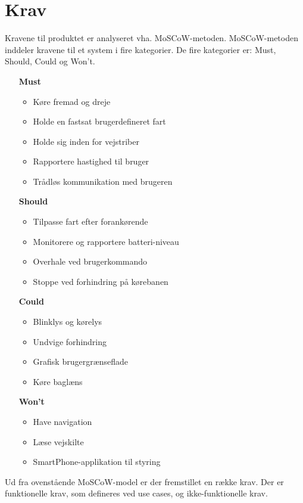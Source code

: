 \chapter{Krav}
Kravene til produktet er analyseret vha. MoSCoW-metoden\cite{MoSCoW}. MoSCoW-metoden inddeler kravene til et system i fire kategorier. De fire kategorier er: Must, Should, Could og Won't.

\begin{itemize}
	\item[\textbf{Must}]
	\begin{itemize}
		\item Køre fremad og dreje
		\item Holde en fastsat brugerdefineret fart
		\item Holde sig inden for vejstriber
		\item Rapportere hastighed til bruger
		\item Trådløs kommunikation med brugeren
	\end{itemize}
	\item[\textbf{Should}]
	\begin{itemize}
		\item Tilpasse fart efter forankørende
		\item Monitorere og rapportere batteri-niveau
		\item Overhale ved brugerkommando
		\item Stoppe ved forhindring på kørebanen
	\end{itemize}
	\item[\textbf{Could}] 
	\begin{itemize}
		\item Blinklys og kørelys
		\item Undvige forhindring
		\item Grafisk brugergrænseflade
		\item Køre baglæns
	\end{itemize}
	\item[\textbf{Won't}]
	\begin{itemize}
		\item Have navigation
		\item Læse vejskilte
		\item SmartPhone-applikation til styring
	\end{itemize}
\end{itemize}

Ud fra ovenstående MoSCoW-model er der fremstillet en række krav. Der er funktionelle krav, som defineres ved use cases, og ikke-funktionelle krav.

